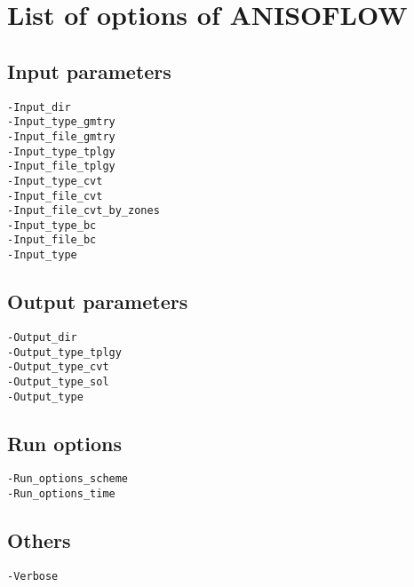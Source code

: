 \chapter{List of options of ANISOFLOW}

\section{Input parameters}

\texttt{-Input\_dir}\\
\texttt{-Input\_type\_gmtry}\\
\texttt{-Input\_file\_gmtry}\\
\texttt{-Input\_type\_tplgy}\\
\texttt{-Input\_file\_tplgy}\\
\texttt{-Input\_type\_cvt}\\
\texttt{-Input\_file\_cvt}\\
\texttt{-Input\_file\_cvt\_by\_zones}\\
\texttt{-Input\_type\_bc}\\
\texttt{-Input\_file\_bc}\\
\texttt{-Input\_type}

\section{Output parameters}

\texttt{-Output\_dir}\\
\texttt{-Output\_type\_tplgy}\\
\texttt{-Output\_type\_cvt}\\
\texttt{-Output\_type\_sol}\\
\texttt{-Output\_type}

\section{Run options}

\texttt{-Run\_options\_scheme}\\
\texttt{-Run\_options\_time}

\section{Others}

\texttt{-Verbose}